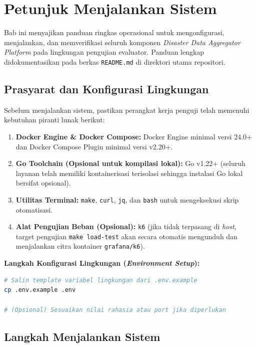 \chapter{Petunjuk Menjalankan Sistem}
\label{chap:petunjuk}

Bab ini menyajikan panduan ringkas operasional untuk mengonfigurasi, menjalankan, dan memverifikasi seluruh komponen \textit{Disaster Data Aggregator \mbox{Platform}} pada lingkungan pengujian evaluator. Panduan lengkap didokumentasikan pada berkas \texttt{README.md} di direktori utama repositori.

\section{Prasyarat dan Konfigurasi Lingkungan}
\label{sec:petunjuk_prasyarat}

Sebelum menjalankan sistem, pastikan perangkat kerja penguji telah memenuhi kebutuhan piranti lunak berikut:
\begin{enumerate}
    \item \textbf{Docker Engine \& Docker Compose:} Docker Engine minimal versi 24.0+ dan Docker Compose Plugin minimal versi v2.20+.
    \item \textbf{Go Toolchain (Opsional untuk kompilasi lokal):} Go v1.22+ (seluruh layanan telah memiliki kontainerisasi terisolasi sehingga instalasi Go lokal bersifat opsional).
    \item \textbf{Utilitas Terminal:} \texttt{make}, \texttt{curl}, \texttt{jq}, dan \texttt{bash} untuk mengeksekusi skrip otomatisasi.
    \item \textbf{Alat Pengujian Beban (Opsional):} \texttt{k6} (jika tidak terpasang di \textit{host}, target pengujian \texttt{make load-test} akan secara otomatis mengunduh dan menjalankan citra kontainer \texttt{grafana/k6}).
\end{enumerate}

\noindent\textbf{Langkah Konfigurasi Lingkungan (\textit{Environment Setup}):}
\begin{lstlisting}[language=bash, caption={Inisialisasi Variabel Lingkungan}]
# Salin template variabel lingkungan dari .env.example
cp .env.example .env

# (Opsional) Sesuaikan nilai rahasia atau port jika diperlukan
\end{lstlisting}

\section{Langkah Menjalankan Sistem}
\label{sec:petunjuk_menjalankan}

